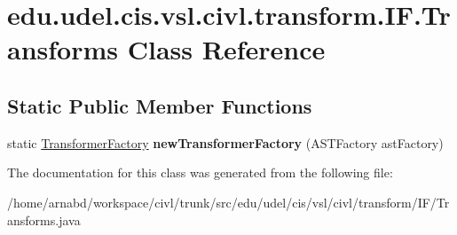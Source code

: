 \hypertarget{classedu_1_1udel_1_1cis_1_1vsl_1_1civl_1_1transform_1_1IF_1_1Transforms}{}\section{edu.\+udel.\+cis.\+vsl.\+civl.\+transform.\+I\+F.\+Transforms Class Reference}
\label{classedu_1_1udel_1_1cis_1_1vsl_1_1civl_1_1transform_1_1IF_1_1Transforms}
\subsection*{Static Public Member Functions}
\begin{DoxyCompactItemize}
\item 
\hypertarget{classedu_1_1udel_1_1cis_1_1vsl_1_1civl_1_1transform_1_1IF_1_1Transforms_a398abc3c0f7900298555f80d32f49c82}{}static \hyperlink{classedu_1_1udel_1_1cis_1_1vsl_1_1civl_1_1transform_1_1IF_1_1TransformerFactory}{Transformer\+Factory} {\bfseries new\+Transformer\+Factory} (A\+S\+T\+Factory ast\+Factory)\label{classedu_1_1udel_1_1cis_1_1vsl_1_1civl_1_1transform_1_1IF_1_1Transforms_a398abc3c0f7900298555f80d32f49c82}

\end{DoxyCompactItemize}


The documentation for this class was generated from the following file\+:\begin{DoxyCompactItemize}
\item 
/home/arnabd/workspace/civl/trunk/src/edu/udel/cis/vsl/civl/transform/\+I\+F/Transforms.\+java\end{DoxyCompactItemize}
